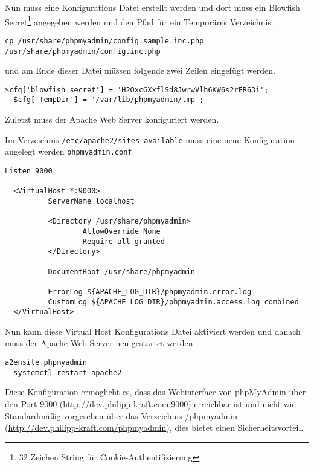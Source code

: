 Nun muss eine Konfigurations Datei erstellt werden und dort muss ein Blowfish
Secret\footnote{32 Zeichen String für Cookie-Authentifizierung} angegeben werden und den Pfad für ein Temporäres Verzeichnis.

\begin{lstlisting}[caption={phpMyAdmin Konfigurationsdatei erstellen}]
  cp /usr/share/phpmyadmin/config.sample.inc.php /usr/share/phpmyadmin/config.inc.php
\end{lstlisting}

und am Ende dieser Datei müssen folgende zwei Zeilen eingefügt werden.

\begin{lstlisting}[caption={phpMyAdmin Blowfish Secret und TempDir}]
  $cfg['blowfish_secret'] = 'H2OxcGXxflSd8JwrwVlh6KW6s2rER63i'; 
  $cfg['TempDir'] = '/var/lib/phpmyadmin/tmp';
\end{lstlisting}

Zuletzt muss der Apache Web Server konfiguriert werden.

Im Verzeichnis \verb|/etc/apache2/sites-available| muss eine neue
Konfiguration angelegt werden \verb|phpmyadmin.conf|.

\begin{lstlisting}[caption={phpmyadmin.conf}]
  Listen 9000

  <VirtualHost *:9000>
          ServerName localhost
  
          <Directory /usr/share/phpmyadmin>
                  AllowOverride None
                  Require all granted
          </Directory>
  
          DocumentRoot /usr/share/phpmyadmin
  
          ErrorLog ${APACHE_LOG_DIR}/phpmyadmin.error.log
          CustomLog ${APACHE_LOG_DIR}/phpmyadmin.access.log combined
  </VirtualHost>
\end{lstlisting}

Nun kann diese Virtual Host Konfigurations Datei aktiviert werden und danach
muss der Apache Web Server neu gestartet werden.

\begin{lstlisting}[caption={Virtual Host aktivieren}]
  a2ensite phpmyadmin
  systemctl restart apache2
\end{lstlisting}

Diese Konfiguration
ermöglicht es, dass das Webinterface von phpMyAdmin über den Port 9000 (\url{http://dev.philipp-kraft.com:9000})
erreichbar ist und nicht wie Standardmäßig vorgesehen über das Verzeichnis
/phpmyadmin (\url{http://dev.philipp-kraft.com/phpmyadmin}), dies bietet einen Sicherheitsvorteil.

